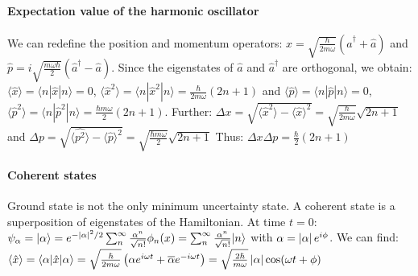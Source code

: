 
\paragraph{Expectation value of the harmonic oscillator}
We can redefine the position and momentum operators:
$\hat{x} = \sqrt{\frac{\hbar}{2 m \omega}} (\hat{a}^\dagger + \hat{a})$
and $\hat{p} = i \sqrt{\frac{m \omega \hbar}{2}} (\hat{a}^\dagger - \hat{a})$.
Since the eigenstates of $\hat{a}$ and $\hat{a}^\dagger$ are orthogonal, we obtain:
$\langle \hat{x} \rangle = \langle n | \hat{x} | n \rangle = 0$,
$\langle \hat{x}^2 \rangle = \langle n | \hat{x}^2 | n \rangle = \frac{\hbar}{2 m \omega} (2n+1)$
and $\langle \hat{p} \rangle = \langle n | \hat{p} | n \rangle = 0$,
$\langle \hat{p}^2 \rangle = \langle n | \hat{p}^2 | n \rangle = \frac{\hbar m \omega}{2} (2n+1)$.
Further:
$\Delta x = \sqrt{\langle \hat{x}^2 \rangle - \langle \hat{x} \rangle^2} = \sqrt{\frac{\hbar}{2 m \omega}} \sqrt{2n+1}$
and
$\Delta p = \sqrt{\langle \hat{p^2} \rangle - \langle \hat{p} \rangle^2} = \sqrt{\frac{\hbar m \omega}{2}} \sqrt{2n+1}$
Thus: $\Delta x \Delta p = \frac{\hbar}{2} (2n+1)$

\paragraph{Coherent states}
Ground state is not the only minimum uncertainty state. A coherent state is a
superposition of eigenstates of the Hamiltonian. At time $t=0$:
$\psi_\alpha = | \alpha \rangle = e^{- \left\vert \alpha \right\vert^2 / 2} \sum_n^\infty \frac{\alpha^n}{\sqrt{n!}} \phi_n(x)
= \sum_n^\infty \frac{\alpha^n}{\sqrt{n!}} | n \rangle$ with $\alpha = \left\vert \alpha \right\vert e^{i \phi}$.
We can find: $\langle \hat{x} \rangle = \langle \alpha | \hat{x} | \alpha \rangle =
\sqrt{\frac{\hbar}{2 m \omega}} \left( \alpha e^{i \omega t} + \overline{\alpha} e^{-i \omega t} \right)
= \sqrt{\frac{2 \hbar}{m \omega}} \left\vert \alpha \right\vert \cos(\omega t + \phi)$


